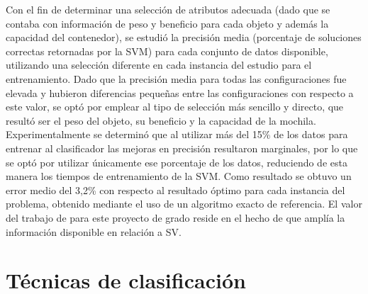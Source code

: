 Con el fin de determinar una selección de atributos adecuada (dado que se contaba con información de peso y beneficio para cada objeto y además la capacidad del contenedor), se estudió la precisión media (porcentaje de soluciones correctas retornadas por la SVM) para cada conjunto de datos disponible, utilizando una selección diferente en cada instancia del estudio para el entrenamiento.
Dado que la precisión media para todas las configuraciones fue elevada y hubieron diferencias pequeñas entre las configuraciones con respecto a este valor, se optó por emplear al tipo de selección más sencillo y directo, que resultó ser el peso del objeto, su beneficio y la capacidad de la mochila.
Experimentalmente se determinó que al utilizar más del 15\% de los datos para entrenar al clasificador las mejoras en precisión resultaron marginales, por lo que se optó por utilizar únicamente ese porcentaje de los datos, reduciendo de esta manera los tiempos de entrenamiento de la SVM. Como resultado se obtuvo un error medio del 3,2\% con respecto al resultado óptimo para cada instancia del problema, obtenido mediante el uso de un algoritmo exacto de referencia.
El valor del trabajo de \citet{savant-bag} para este proyecto de grado reside en el hecho de que amplía la información disponible en relación a SV.

\section{Técnicas de clasificación} \label{section-trabajos-tecnicas-clasificacion}

